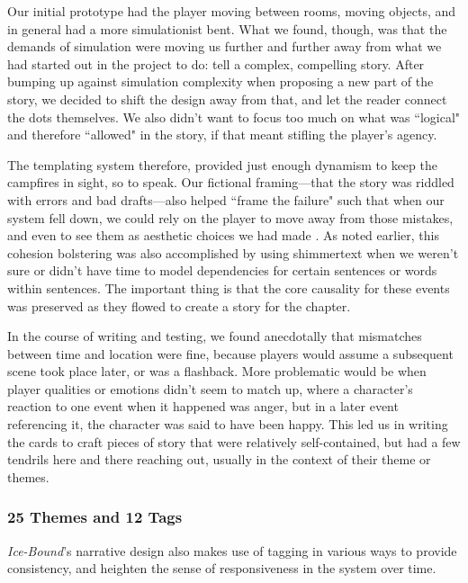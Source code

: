 Our initial prototype had the player moving between rooms, moving objects, and in general had a more simulationist bent. What we found, though, was that the demands of simulation were moving us further and further away from what we had started out in the project to do: tell a complex, compelling story. After bumping up against simulation complexity when proposing a new part of the story, we decided to shift the design away from that, and let the reader connect the dots themselves. We also didn't want to focus too much on what was ``logical" and therefore ``allowed" in the story, if that meant stifling the player's agency.

The templating system therefore, provided just enough dynamism to keep the campfires in sight, so to speak. Our fictional framing---that the story was riddled with errors and bad drafts---also helped ``frame the failure" such that when our system fell down, we could rely on the player to move away from those mistakes, and even to see them as aesthetic choices we had made \cite{reed2014ice}. As noted earlier, this cohesion bolstering was also accomplished by using shimmertext when we weren't sure or didn't have time to model dependencies for certain sentences or words within sentences. The important thing is that the core causality for these events was preserved as they flowed to create a story for the chapter.

In the course of writing and testing, we found anecdotally that mismatches between time and location were fine, because players would assume a subsequent scene took place later, or was a flashback. More problematic would be when player qualities or emotions didn't seem to match up, where a character's reaction to one event when it happened was anger, but in a later event referencing it, the character was said to have been happy. This led us in writing the cards to craft pieces of story that were relatively self-contained, but had a few tendrils here and there reaching out, usually in the context of their theme or themes.

\subsubsection{25 Themes and 12 Tags}\label{subsubsec:25-themes-and-12-tags}

\textit{Ice-Bound}'s narrative design also makes use of tagging in various ways to provide consistency, and heighten the sense of responsiveness in the system over time.


